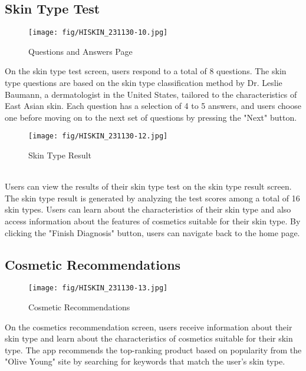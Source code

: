 \documentclass[conference]{IEEEtran}
\begin{document}
\subsection{Skin Type Test}
\begin{figure}[h]
    \centering
    \texttt{[image: fig/HISKIN\_231130-10.jpg]}
    \label{fig:Questions and Answers}
    \caption{Questions and Answers Page} 
    \end{figure}
On the skin type test screen, users respond to a total of 8 questions. The skin type questions are based on the skin type classification method by Dr. Leslie Baumann, a dermatologist in the United States, tailored to the characteristics of East Asian skin. Each question has a selection of 4 to 5 answers, and users choose one before moving on to the next set of questions by pressing the "Next" button.\\ 
\begin{figure}[h]
    \centering
    \texttt{[image: fig/HISKIN\_231130-12.jpg]}
    \label{fig:Skin Type Result}
    \caption{Skin Type Result} 
    \end{figure} \\
Users can view the results of their skin type test on the skin type result screen. The skin type result is generated by analyzing the test scores among a total of 16 skin types. Users can learn about the characteristics of their skin type and also access information about the features of cosmetics suitable for their skin type. By clicking the "Finish Diagnosis" button, users can navigate back to the home page.

\subsection{Cosmetic Recommendations}
\begin{figure}[h]
    \centering
    \texttt{[image: fig/HISKIN\_231130-13.jpg]}
    \label{fig:Cosmetic Recommendations}
    \caption{Cosmetic Recommendations} 
    \end{figure}
On the cosmetics recommendation screen, users receive information about their skin type and learn about the characteristics of cosmetics suitable for their skin type. The app recommends the top-ranking product based on popularity from the "Olive Young" site by searching for keywords that match the user's skin type.
\end{document}
